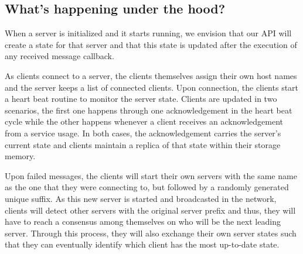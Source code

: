 \subsection{What's happening under the hood?}

When a server is initialized and it starts running, we envision that our API will create a state for that server and that this state is updated after the execution of any received message callback. 

As clients connect to a server, the clients themselves assign their own host names and the server keeps a list of connected clients. Upon connection, the clients start a heart beat routine to monitor the server state. Clients are updated in two scenarios, the first one happens through one acknowledgement in the heart beat cycle while the other happens whenever a client receives an acknowledgement from a service usage. In both cases, the acknowledgement carries the server's current state and clients maintain a replica of that state within their storage memory.

Upon failed messages, the clients will start their own servers with the same name as the one that they were connecting to, but followed by a randomly generated unique suffix. As this new server is started and broadcasted in the network, clients will detect other servers with the original server prefix and thus, they will have to reach a consensus among themselves on who will be the next leading server. Through this process, they will also exchange their own server states such that they can eventually identify which client has the most up-to-date state.
